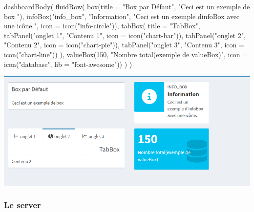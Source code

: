 \documentclass[
]{article}
\newenvironment{Shaded}{\begin{snugshade}}{\end{snugshade}}
\newcommand{\AttributeTok}[1]{\textcolor[rgb]{0.77,0.63,0.00}{#1}}
\newcommand{\DecValTok}[1]{\textcolor[rgb]{0.00,0.00,0.81}{#1}}
\newcommand{\FunctionTok}[1]{\textcolor[rgb]{0.00,0.00,0.00}{#1}}
\newcommand{\NormalTok}[1]{#1}
\newcommand{\StringTok}[1]{\textcolor[rgb]{0.31,0.60,0.02}{#1}}
\begin{document}
\begin{Shaded}
\begin{Highlighting}[]
  \FunctionTok{dashboardBody}\NormalTok{(}
    \FunctionTok{fluidRow}\NormalTok{(}
      \FunctionTok{box}\NormalTok{(}\AttributeTok{title =} \StringTok{"Box par Défaut"}\NormalTok{, }\StringTok{"Ceci est un exemple de box "}\NormalTok{),}
     \FunctionTok{infoBox}\NormalTok{(}\StringTok{"info\_box"}\NormalTok{, }\StringTok{"Information"}\NormalTok{, }\StringTok{"Ceci est un exemple d\textquotesingle{}infoBox avec une icône."}\NormalTok{, }
              \AttributeTok{icon =} \FunctionTok{icon}\NormalTok{(}\StringTok{"info{-}circle"}\NormalTok{)),}
      \FunctionTok{tabBox}\NormalTok{(}
        \AttributeTok{title =} \StringTok{"TabBox"}\NormalTok{,}
        \FunctionTok{tabPanel}\NormalTok{(}\StringTok{"onglet 1"}\NormalTok{, }\StringTok{"Contenu 1"}\NormalTok{, }\AttributeTok{icon =} \FunctionTok{icon}\NormalTok{(}\StringTok{"chart{-}bar"}\NormalTok{)),}
        \FunctionTok{tabPanel}\NormalTok{(}\StringTok{"onglet 2"}\NormalTok{, }\StringTok{"Contenu 2"}\NormalTok{, }\AttributeTok{icon =} \FunctionTok{icon}\NormalTok{(}\StringTok{"chart{-}pie"}\NormalTok{)),}
        \FunctionTok{tabPanel}\NormalTok{(}\StringTok{"onglet 3"}\NormalTok{, }\StringTok{"Contenu 3"}\NormalTok{, }\AttributeTok{icon =} \FunctionTok{icon}\NormalTok{(}\StringTok{"chart{-}line"}\NormalTok{))}
\NormalTok{      ),}
      \FunctionTok{valueBox}\NormalTok{(}\DecValTok{150}\NormalTok{, }\StringTok{"Nombre total(exemple de valueBox)"}\NormalTok{, }
               \AttributeTok{icon =} \FunctionTok{icon}\NormalTok{(}\StringTok{"database"}\NormalTok{, }\AttributeTok{lib =} \StringTok{"font{-}awesome"}\NormalTok{))}
\NormalTok{    )}
\NormalTok{  )}
\end{Highlighting}
\end{Shaded}

\includegraphics{images/clipboard-2508999486.png}

\hypertarget{le-server}{%
\subsubsection{Le server}\label{le-server}}
\end{document}
